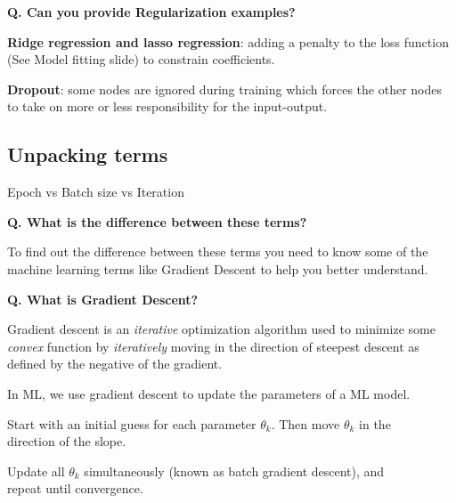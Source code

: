 \begin{frame}[fragile]{\textbf{Q. Can you provide Regularization examples?}}
  \begin{wideitemize}
    \item \textbf{Ridge regression and lasso regression}: adding a penalty
    to the loss function (See Model fitting slide) to constrain coefficients.
    \item \textbf{Dropout}: some nodes are ignored during training which
    forces the other nodes to take on more or less responsibility for the
    input-output.
  \end{wideitemize}
\end{frame}

\subsection{Unpacking terms}
\begin{transitionsubframe}
  \begin{center}
    \Huge Epoch vs Batch size vs Iteration
  \end{center}
\end{transitionsubframe}

\begin{frame}[fragile]{\textbf{Q. What is the difference between these terms?}}
  \begin{wideitemize}
    \item To find out the difference between these terms you need to know some
    of the machine learning terms like Gradient Descent to help you better
    understand.
  \end{wideitemize}
\end{frame}


\begin{frame}[fragile]{\textbf{Q. What is Gradient Descent?}}
  \begin{wideitemize}
    \item Gradient descent is an \textit{iterative} optimization algorithm used to minimize
    some \textit{convex} function by \textit{iteratively} moving in the direction of
    steepest descent as defined by the negative of the gradient.
    \item In ML, we use gradient descent to update the parameters of a ML model.
    \begin{wideitemize}
      \item Start with an initial guess for each parameter $\theta_{k}$. Then
      move $\theta_{k}$ in the \\direction of the slope.
      \item Update all $\theta_{k}$ simultaneously (known as batch gradient descent),
      and \\repeat until convergence.
    \end{wideitemize}
  \end{wideitemize}
\end{frame}

